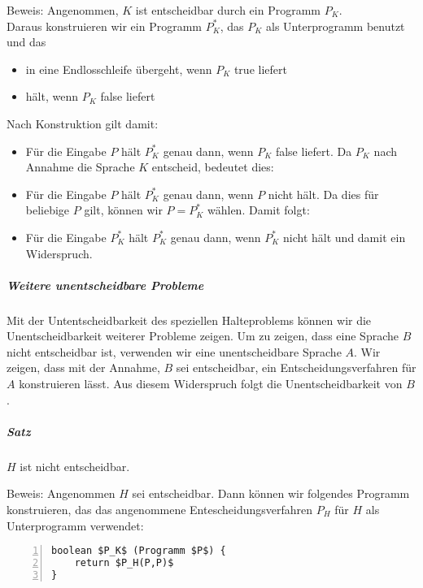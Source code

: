 \documentclass[a4paper]{scrartcl}
\begin{document}
Beweis: Angenommen, $K$ ist entscheidbar durch ein Programm $P_K$.\\
Daraus konstruieren wir ein Programm $P_K^*$, das $P_K$ als Unterprogramm benutzt und das 
\begin{itemize}
\item in eine Endlosschleife übergeht, wenn $P_K$ true liefert
\item hält, wenn $P_K$ false liefert\\
\end{itemize}
Nach Konstruktion gilt damit:
\begin{itemize}
\item Für die Eingabe $P$ hält $P_K^*$ genau dann, wenn $P_K$ false liefert. Da $P_K$ nach Annahme die Sprache $K$ entscheid, bedeutet dies:
\item Für die Eingabe $P$ hält $P_K^*$ genau dann, wenn $P$ nicht hält. Da dies für beliebige $P$ gilt, können wir $P=P_K^*$ wählen. Damit folgt:
\item Für die Eingabe $P_K^*$ hält $P_K^*$ genau dann, wenn $P_K^*$ nicht hält und damit ein Widerspruch.
\end{itemize}

\subparagraph{Weitere unentscheidbare Probleme}
Mit der Untentscheidbarkeit des speziellen Halteproblems können wir die Unentscheidbarkeit weiterer Probleme zeigen. Um zu zeigen, dass eine Sprache $B$ nicht entscheidbar ist, verwenden wir eine unentscheidbare Sprache $A$. Wir zeigen, dass mit der Annahme, $B$ sei entscheidbar, ein Entscheidungsverfahren für $A$ konstruieren lässt. Aus diesem Widerspruch folgt die Unentscheidbarkeit von $B$.

\subparagraph{Satz} $H$ ist nicht entscheidbar.

Beweis: Angenommen $H$ sei entscheidbar. Dann können wir folgendes Programm konstruieren, das das angenommene Entescheidungsverfahren $P_H$ für $H$ als Unterprogramm verwendet:\\
\begin{lstlisting}[numbers=left, tabsize=4, style=customc,mathescape]
boolean $P_K$ (Programm $P$) {
    return $P_H(P,P)$
}
\end{lstlisting}
\end{document}
